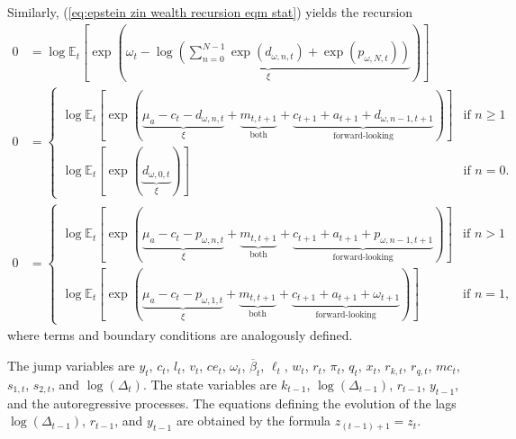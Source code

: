 \documentclass[12 pt, oneside]{article}
\theoremstyle{definition}
\theoremstyle{definition}
\theoremstyle{definition}
\newcommand{\E}{\mathbb{E}}
\begin{document}
Similarly, (\ref{eq:epstein zin wealth recursion eqm stat}) yields the recursion
\begin{align}
  0 & = \log\E_t\left[\exp\left(\underbrace{\omega_t - \log\left(\sum_{n = 0}^{N - 1}\exp(d_{\omega, n, t}) + \exp(p_{\omega, N, t})\right)}_{\xi}\right)\right]\\
  0 & =
      \begin{cases}
        \log\E_t\left[\exp\left(\underbrace{\mu_a - c_t - d_{\omega, n, t}}_{\xi} + \underbrace{m_{t, t + 1}}_{\text{both}} + \underbrace{c_{t + 1} + a_{t + 1} + d_{\omega, n - 1, t + 1}}_{\text{forward-looking}}\right)\right] & \text{if } n \geq 1\\
        \log\E_t\left[\exp\left(\underbrace{d_{\omega, 0, t}}_{\xi}\right)\right] & \text{if } n = 0.
      \end{cases}\\
  0 & =
      \begin{cases}
        \log\E_t\left[\exp\left(\underbrace{\mu_a - c_t - p_{\omega, n, t}}_{\xi} + \underbrace{m_{t, t + 1}}_{\text{both}} + \underbrace{c_{t + 1} + a_{t + 1} + p_{\omega, n - 1, t + 1}}_{\text{forward-looking}} \right)\right] & \text{if } n > 1\\
        \log\E_t\left[\exp\left(\underbrace{\mu_a - c_t - p_{\omega, 1, t}}_{\xi} + \underbrace{m_{t, t + 1}}_{\text{both}} + \underbrace{c_{t + 1} + a_{t + 1} + \omega_{t + 1}}_{\text{forward-looking}}\right)\right] & \text{if } n = 1,
      \end{cases}
\end{align}
where terms and boundary conditions are analogously defined.

The jump variables are $y_t$, $c_t$, $l_t$, $v_t$, $ce_t$, $\omega_t$, $\overline{\beta}_t$, $\ell_t$, $w_t$, $r_t$, $\pi_t$, $q_t$, $x_t$, $r_{k, t}$, $r_{q, t}$, $mc_t$, $s_{1, t}$, $s_{2, t}$, and $\log(\Delta_t)$.
The state variables are $k_{t - 1}$, $\log(\Delta_{t - 1})$, $r_{t - 1}$, $y_{t - 1}$, and the autoregressive processes. The equations defining the evolution of the lags $\log(\Delta_{t - 1})$, $r_{t - 1}$, and $y_{t - 1}$ are obtained by the formula $z_{(t - 1) + 1} = z_t$.


\pagebreak
\appendixpage
\appendix
\end{document}
